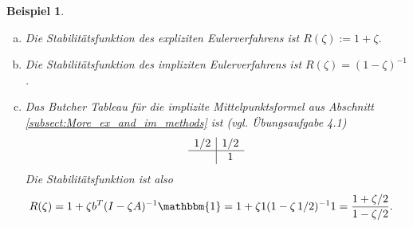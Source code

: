 \documentclass[12pt,a4paper]{book}
\theoremstyle{break}
\newtheorem{beispiel}[theorem]{Beispiel}
\theoremstyle{nonumberplain}
\newcommand{\1}{\mathbbm{1}} 			      	%
\begin{document}
\begin{beispiel}
\begin{enumerate}[(a)]
\item Die Stabilitätsfunktion des expliziten Eulerverfahrens ist
$R(\zeta):=1+\zeta$.
\item Die Stabilitätsfunktion des impliziten Eulerverfahrens ist $R(\zeta)=(1-\zeta )^{-1}$.
\item Das Butcher Tableau für die implizite Mittelpunktsformel aus Abschnitt \ref{subsect:More_ex_and_im_methods} 
ist (vgl. Übungsaufgabe 4.1)
\[
\begin{array}{c | c}
1/2 & 1/2\\ \hline
 & 1
\end{array}
\]
Die Stabilitätsfunktion ist also
\begin{align*}
R(\zeta) &= 1+\zeta b^T (I-\zeta A)^{-1} \1= 1+\zeta 1 (1-\zeta\, 1/2)^{-1} 1
= \frac{1+\zeta/2}{1-\zeta/2}.
\end{align*}

\end{enumerate}
\end{beispiel}
\end{document}
